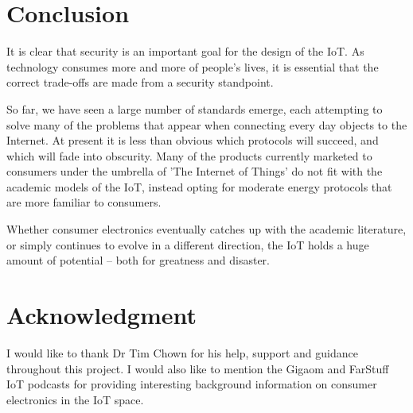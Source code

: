 \documentclass[10pt,journal,compsoc]{IEEEtran}
\begin{document}
\section{Conclusion}
It is clear that security is an important goal for the design of the IoT. As
technology consumes more and more of people's lives, it is essential that the
correct trade-offs are made from a security standpoint. 

So far, we have seen a large number of standards emerge, each attempting to
solve many of the problems that appear when connecting every day objects to the
Internet. At present it is less than obvious which protocols will succeed, and
which will fade into obscurity. Many of the products currently marketed to
consumers under the umbrella of 'The Internet of Things' do not fit with the
academic models of the IoT, instead opting for moderate energy protocols that
are more familiar to consumers. 

Whether consumer electronics eventually catches up with the academic
literature, or simply continues to evolve in a different direction, the IoT
holds a huge amount of potential -- both for greatness and disaster.  


\section*{Acknowledgment}
I would like to thank Dr Tim Chown for his help, support and guidance
throughout this project. I would also like to mention the Gigaom and FarStuff
IoT podcasts for providing interesting background information on consumer
electronics in the IoT space. 


\end{document}
